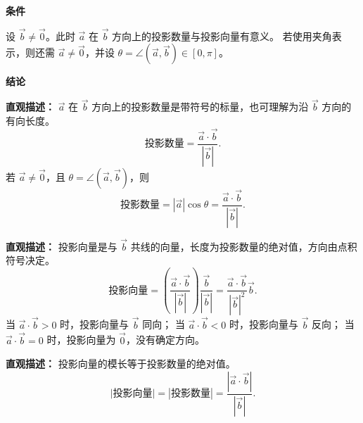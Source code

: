 \begin{statementbox}
	\textbf{\textcolor{CStatement}{条件}}
	\begin{description}[style=nextline, leftmargin=2.8em, labelsep=0.5em, itemsep=0.35em]
		\item[\textbf{\textcolor{CStatement}{条件1（投影方向非零）：}}] 设 $\vec{b}\ne\vec{0}$。此时 $\vec{a}$ 在 $\vec{b}$ 方向上的投影数量与投影向量有意义。
		      若使用夹角表示，则还需 $\vec{a}\ne\vec{0}$，并设 $\theta=\angle(\vec{a},\vec{b})\in[0,\pi]$。
	\end{description}

	\textbf{\textcolor{CStatement}{结论}}
	\begin{description}[style=nextline, leftmargin=2.8em, labelsep=0.5em, itemsep=0.45em]
		\item[\textbf{\textcolor{CStatement}{结论一（投影数量）：}}]
		      \textbf{\textcolor{CStatement}{直观描述：}} $\vec{a}$ 在 $\vec{b}$ 方向上的投影数量是带符号的标量，也可理解为沿 $\vec{b}$ 方向的有向长度。
		      \[
			      \text{投影数量}=\frac{\vec{a}\cdot\vec{b}}{|\vec{b}|}.
		      \]
		      若 $\vec{a}\ne\vec{0}$，且 $\theta=\angle(\vec{a},\vec{b})$，则
		      \[
			      \text{投影数量}=|\vec{a}|\cos\theta=\frac{\vec{a}\cdot\vec{b}}{|\vec{b}|}.
		      \]

		\item[\textbf{\textcolor{CStatement}{结论二（投影向量）：}}]
		      \textbf{\textcolor{CStatement}{直观描述：}} 投影向量是与 $\vec{b}$ 共线的向量，长度为投影数量的绝对值，方向由点积符号决定。
		      \[
			      \text{投影向量}
			      =\left(\frac{\vec{a}\cdot\vec{b}}{|\vec{b}|}\right)\frac{\vec{b}}{|\vec{b}|}
			      =\frac{\vec{a}\cdot\vec{b}}{|\vec{b}|^{2}}\vec{b}.
		      \]
		      当 $\vec{a}\cdot\vec{b}>0$ 时，投影向量与 $\vec{b}$ 同向；
		      当 $\vec{a}\cdot\vec{b}<0$ 时，投影向量与 $\vec{b}$ 反向；
		      当 $\vec{a}\cdot\vec{b}=0$ 时，投影向量为 $\vec{0}$，没有确定方向。

		\item[\textbf{\textcolor{CStatement}{推广结论（投影向量模长）：}}]
		      \textbf{\textcolor{CStatement}{直观描述：}} 投影向量的模长等于投影数量的绝对值。
		      \[
			      \bigl|\text{投影向量}\bigr|
			      =
			      \left|\text{投影数量}\right|
			      =
			      \frac{|\vec{a}\cdot\vec{b}|}{|\vec{b}|}.
		      \]
	\end{description}
\end{statementbox}